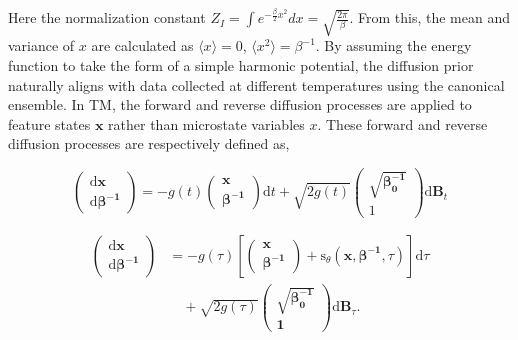 \documentclass[aip,jcp,reprint,longbibliography]{revtex4-1}
\begin{document}
\noindent Here the normalization constant $ Z_I = \int e^{-\frac{\beta}{2} x^2} dx = \sqrt{\frac{2\pi}{\beta}} $. From this, the mean and variance of $ x $ are calculated as $\langle x \rangle = 0$, $\langle x^2 \rangle = \beta^{-1}$. By assuming the energy function to take the form of a simple harmonic potential, the diffusion prior naturally aligns with data collected at different temperatures using the canonical ensemble. In TM\cite{herron2024inferring}, the forward and reverse diffusion processes are applied to feature states $ \mathbf{x} $ rather than microstate variables $ x $. These forward and reverse diffusion processes are respectively defined as,

\begin{equation}
\begin{pmatrix}
\mathrm{d}\mathbf{x}\\
\mathrm{d}\boldsymbol{\beta^{-1}}
\end{pmatrix}
=
-g(t)
\begin{pmatrix}
\mathbf{x}\\
\boldsymbol{\beta^{-1}}
\end{pmatrix}
\mathrm{d}t
+ \sqrt{2 g(t)} 
\begin{pmatrix}
\sqrt{\boldsymbol{\beta_0^{-1}}} \\
1
\end{pmatrix}
\mathrm{d}\mathbf{B}_t
\label{eq:tm_forward}
\end{equation}

\begin{equation}
\begin{aligned}
\begin{pmatrix}
\mathrm{d}\mathbf{x}\\
\mathrm{d}\boldsymbol{\beta^{-1}}
\end{pmatrix}
&=
-g(\tau) 
\left[
\begin{pmatrix}
\mathbf{x}\\
\boldsymbol{\beta^{-1}}
\end{pmatrix}
+ \mathrm{s}_\theta(\mathbf{x}, \boldsymbol{\beta^{-1}}, \tau)
\right] \mathrm{d}\tau \\
&\quad + \sqrt{2 g(\tau)} 
\begin{pmatrix}
\sqrt{\boldsymbol{\beta_0^{-1}}} \\
\mathbf{1}
\end{pmatrix}
\mathrm{d}\mathbf{B}_\tau.
\end{aligned}
\label{eq:tm_backward}
\end{equation}
\end{document}
